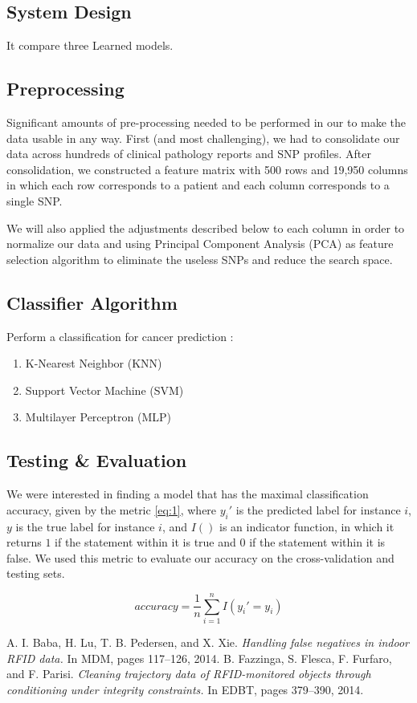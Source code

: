\documentclass[a4paper,oneside]{article}
\begin{document}
\subsection{System Design}
It compare three Learned models.
\subsection{Preprocessing}
Significant amounts of pre-processing needed to be performed in our to make the data usable in any way. First (and most challenging), we had to consolidate our data across hundreds of clinical pathology reports and SNP profiles. After consolidation, we constructed a feature matrix with 500 rows and 19,950 columns in which each row corresponds to a patient and each column corresponds to a single SNP.
\par
We will also applied the adjustments described below to each column in order to normalize our data and using Principal Component Analysis (PCA) as feature selection algorithm to eliminate the useless SNPs and reduce the search space. 
\subsection{Classifier Algorithm}

Perform a classification for cancer prediction :
\begin{enumerate}
\item K-Nearest Neighbor (KNN)
\item Support Vector Machine (SVM)
\item Multilayer Perceptron (MLP)
\end{enumerate}

\subsection{Testing \& Evaluation}
We were interested in finding a model that has the maximal classification accuracy, given by the metric \ref{eq:1}, where $y_{i}'$ is the predicted label for instance $i$, $y$ is the true label for instance $i$, and $I()$ is an indicator function, in which it returns $1$ if the statement within it is true and $0$ if the statement within it is false. We used this metric to evaluate our accuracy on the cross-validation and testing sets.

\begin{equation} \label{eq:1}
accuracy =  \frac{1}{n}  \sum_{i=1}^n  I(y_{i}' = y_{i})
\end{equation}




\begin{thebibliography}{1}
\bibitem{} A. I. Baba, H. Lu, T. B. Pedersen, and X. Xie. {\em Handling false
negatives in indoor RFID data.} In MDM, pages 117–126, 2014.
\bibitem{} B. Fazzinga, S. Flesca, F. Furfaro, and F. Parisi. {\em Cleaning trajectory data of RFID-monitored objects through conditioning under integrity constraints.} In EDBT, pages
379–390, 2014.
\end{thebibliography}
\end{document}
